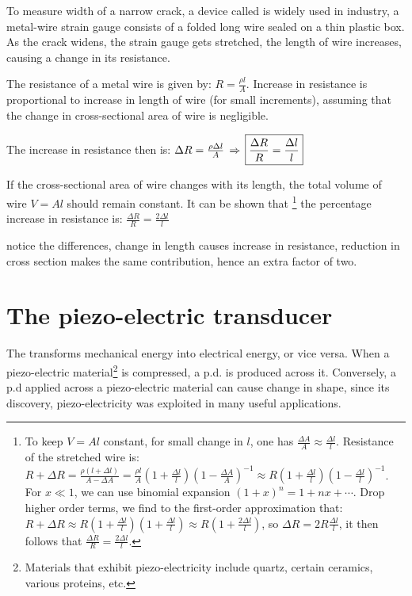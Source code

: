 To measure width of a narrow crack, a device called  is widely used in industry, a metal-wire strain gauge consists of a folded long wire sealed on a thin plastic box. As the crack widens, the strain gauge gets stretched, the length of wire increases, causing a change in its resistance. 

The resistance of a metal wire is given by: $R=\frac{\rho l}{A}$. Increase in resistance is proportional to increase in length of wire (for small increments), assuming that the change in cross-sectional area of wire is negligible.

The increase in resistance then is: $\Delta R = \frac{\rho\Delta l}{A} \, \Rightarrow \, \boxed{\frac{\Delta R}{R} = \frac{\Delta l}{l}}$

If the cross-sectional area of wire changes with its length, the total volume of wire $V=Al$ should remain constant. It can be shown that \footnote{To keep $V=Al$ constant, for small change in $l$, one has $\frac{\Delta A}{A} \approx \frac{\Delta l}{l}$. Resistance of the stretched wire is: $R+\Delta R = \frac{\rho(l+\Delta l)}{A-\Delta A} = \frac{\rho l}{A} \left(1 + \frac{\Delta l}{l}\right) \left(1 - \frac{\Delta A}{A}\right)^{-1} \approx R \left(1 + \frac{\Delta l}{l}\right) \left(1 - \frac{\Delta l}{l}\right)^{-1}$. For $x\ll1$, we can use binomial expansion $(1+x)^n = 1 + nx + \cdots$. Drop higher order terms, we find to the first-order approximation that: $R+\Delta R \approx R \left(1 + \frac{\Delta l}{l}\right) \left(1 + \frac{\Delta l}{l}\right) \approx R\left( 1 + \frac{2\Delta l}{l}\right)$, so $\Delta R = 2R\frac{\Delta l}{l}$, it then follows that $\frac{\Delta R}{R} = \frac{2\Delta l}{l}$.}
 the percentage increase in resistance is: $\boxed{\frac{\Delta R}{R} = \frac{2\Delta l}{l}}$

notice the differences, change in length causes increase in resistance, reduction in cross section makes the same contribution, hence an extra factor of two.

\section{\piste The piezo-electric transducer}\label{ch-piezo}

The  transforms mechanical energy into electrical energy, or vice versa. When a piezo-electric material\footnote{Materials that exhibit piezo-electricity include quartz, certain ceramics, various proteins, etc.} is compressed, a p.d. is produced across it. Conversely, a p.d applied across a piezo-electric material can cause change in shape, since its discovery, piezo-electricity was exploited in many useful applications.

